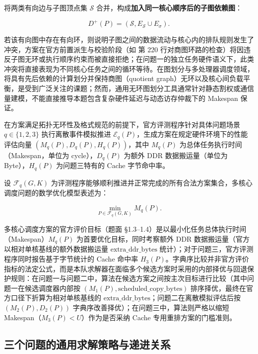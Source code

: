 \documentclass[anonymous,withtoc]{gmcm2026}
\begin{document}
将两类有向边与子图顶点集 \(\mathcal{S}\) 合并，构成\textbf{加入同一核心顺序后的子图依赖图}：

\begin{equation}
D^+(P) = (\mathcal{S}, E_{\mathcal{S}} \cup E_\sigma).
\end{equation}

若该有向图中存在有向环，则说明子图之间的数据流动与核心内的排队规则发生了冲突，方案在官方前置派生与校验阶段（如 \texttt{} 第 220 行对商图环路的检查）将因违反子图无环或执行顺序约束而被直接拒绝；在问题一的独立任务硬件语义下，此类冲突将直接表现为不同核心任务之间的循环等待。在图划分与多处理器调度领域，将具有先后依赖的计算划分并保持商图（quotient graph）无环以及核心间负载平衡，是受到广泛关注的课题\cite{ref6}；然而，通用无环图划分工具通常针对静态割权或通信量建模，不能直接推导本题包含复杂硬件延迟与动态访存仲裁下的 Makespan 保证。

在方案满足拓扑无环性及格式规范的前提下，官方评测程序针对具体问题场景 \(q \in \{1, 2, 3\}\) 执行离散事件模拟推进 \(\mathcal{E}_q(P)\)，生成方案在规定硬件环境下的性能评估向量 \((M_q(P), D_q(P), H_q(P))\)，其中 \(M_q(P)\) 为总体任务执行时间（Makespan，单位为 cycle），\(D_q(P)\) 为额外 DDR 数据搬运量（单位为 Byte），\(H_q(P)\) 为问题三特有的 Cache 字节命中率。

设 \(\mathcal{F}_q(G, K)\) 为评测程序能够顺利推进并正常完成的所有合法方案集合，多核心调度问题的数学优化模型表述为：

\begin{equation}
\min_{P \in \mathcal{F}_q(G, K)} M_q(P).
\end{equation}

多核心调度方案的官方评价目标（题面 §1.3--1.4）是以最小化任务总体执行时间（Makespan）\(M_q(P)\) 为首要优化目标，同时考察额外 DDR 数据搬运量（官方以相对单核基线的额外数据搬运量 \(\text{extra\_ddr\_bytes}\) 统计）；对于问题三，官方评测程序同时报告基于字节统计的 Cache 命中率 \(H_3(P)\)。字典序比较并非官方评价指标的法定公式，而是本队求解器在面临多个候选方案时采用的内部择优与回退保护规则：在问题一与问题二中，算法在候选方案之间按主次目标进行比较（其中问题一在候选调度器内部按 \((M_1(P), \text{scheduled\_copy\_bytes})\) 排序择优，最终在官方口径下折算为相对单核基线的 \(\text{extra\_ddr\_bytes}\)；问题二在离散模拟评估后按 \((M_2(P), D_2(P))\) 字典序改善择优）；在问题三中，算法则严格以缩短 Makespan（\(M_3(P) < U\)）作为是否采纳 Cache 专用重排方案的门槛准则。

\subsection{三个问题的通用求解策略与递进关系}
\end{document}
